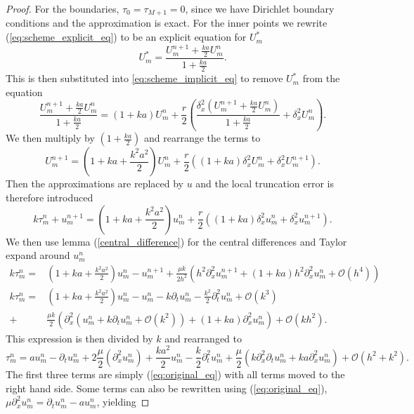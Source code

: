 \begin{proof}
    For the boundaries, $\tau_0=\tau_{M+1}= 0$, since we have Dirichlet boundary conditions and the approximation is exact.
    For the inner points we rewrite (\ref{eq:scheme_explicit_eq}) to be an explicit equation for $U_m^*$
    $$ U_{m}^{*}= \frac{U_{m}^{n+1}+\frac{ka}{2}U_{m}^{n}}{1+\frac{ka}{2}}.$$
    This is then substituted into \ref{eq:scheme_implicit_eq} to remove $U_{m}^{*}$ from the equation
    $$\frac{U_{m}^{n+1}+\frac{ka}{2}U_{m}^{n}}{1+\frac{ka}{2}} = (1+ka)U_{m}^{n}+\frac{r}{2}\left( \frac{\delta_x^2(U_{m}^{n+1}+\frac{ka}{2}U_{m}^{n})}{1+\frac{ka}{2}}  + \delta_x^2 U_{m}^{n}\right).$$
    We then multiply by $(1+\frac{ka}{2})$ and rearrange the terms to
    $$ U_{m}^{n+1}=(1+ ka + \frac{k^2a^2}{2})U_{m}^{n} + \frac{r}{2}\left((1+ka)\delta_x^2U_{m}^{n} +\delta_x^2U_{m}^{n+1}\right).$$
    Then the approximations are replaced by $u$ and the local truncation error is therefore introduced
    $$ k\tau_m^n + u_{m}^{n+1} = (1+ ka + \frac{k^2a^2}{2})u_{m}^{n} + \frac{r}{2}\left((1+ka)\delta_x^2u_{m}^{n} +\delta_x^2u_{m}^{n+1}\right).$$
    We then use lemma (\ref{central_difference}) for the central differences and Taylor expand around $u_{m}^{n}$
    \begin{align*}
        k \tau_m^n =& \left( 1 + ka +\frac{k^2a^2}{2}\right)u_{m}^{n} - u_{m}^{n+1}+\frac{\mu k}{2h^2} \left(h^2\partial_x^2 u_{m}^{n+1} + \left( 1+ka \right) h^2 \partial_x^2u_{m}^{n} + \mathcal{O}(h^4)\right) \\
        k \tau_m^n =& \left( 1 + ka + \frac{k^2a^2}{2}\right)u_{m}^{n} - u_{m}^{n} - k \partial_tu_{m}^{n} - \frac{k^2}{2} \partial_t^2 u_{m}^{n} + \mathcal{O}(k^3)  \\
        +& \frac{\mu k}{2}\left( \partial_x^2 \left( u_{m}^{n} + k \partial_t u_{m}^{n} + \mathcal{O}(k^2)\right) + \left( 1 + ka\right) \partial_x^2  u_{m}^{n} \right) + \mathcal{O}(kh^2).
    \end{align*}
    This expression is then divided by $k$ and rearranged to 
    $$\tau_m^n = a u_{m}^{n} - \partial_tu_{m}^{n} + 2 \frac{\mu}{2}\left( \partial_x^2 u_{m}^{n}\right) +  \frac{ka^2}{2}u_{m}^{n}  - \frac{k}{2} \partial_t^2 u_{m}^{n} + \frac{\mu }{2}\left( k \partial_x^2 \partial_t u_{m}^{n}  + ka \partial_x^2  u_{m}^{n} \right) + \mathcal{O}(h^2 + k^2).$$
    The first three terms are simply (\ref{eq:original_eq}) with all terms moved to the right hand side. Some terms can also be rewritten using (\ref{eq:original_eq}), $\mu \partial_x^2u_{m}^{n} = \partial_t u_{m}^{n} - au_{m}^{n}$, yielding

\end{proof}
